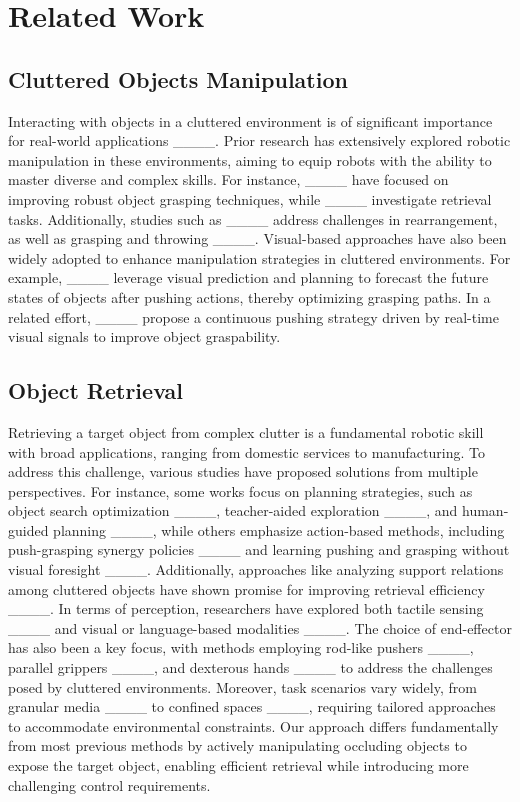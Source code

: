 \section{Related Work}
\subsection{Cluttered Objects Manipulation}
Interacting with objects in a cluttered environment is of significant importance for real-world applications ____. Prior research has extensively explored robotic manipulation in these environments, aiming to equip robots with the ability to master diverse and complex skills. For instance, ____ have focused on improving robust object grasping techniques, while ____ investigate retrieval tasks. Additionally, studies such as ____ address challenges in rearrangement, as well as grasping and throwing ____. Visual-based approaches have also been widely adopted to enhance manipulation strategies in cluttered environments. For example, ____ leverage visual prediction and planning to forecast the future states of objects after pushing actions, thereby optimizing grasping paths. In a related effort, ____ propose a continuous pushing strategy driven by real-time visual signals to improve object graspability.

\subsection{Object Retrieval}
Retrieving a target object from complex clutter is a fundamental robotic skill with broad applications, ranging from domestic services to manufacturing. To address this challenge, various studies have proposed solutions from multiple perspectives. For instance, some works focus on planning strategies, such as object search optimization ____, teacher-aided exploration ____, and human-guided planning ____, while others emphasize action-based methods, including push-grasping synergy policies ____ and learning pushing and grasping without visual foresight ____. Additionally, approaches like analyzing support relations among cluttered objects have shown promise for improving retrieval efficiency ____. In terms of perception, researchers have explored both tactile sensing ____ and visual or language-based modalities ____. The choice of end-effector has also been a key focus, with methods employing rod-like pushers ____, parallel grippers ____, and dexterous hands ____ to address the challenges posed by cluttered environments. Moreover, task scenarios vary widely, from granular media ____ to confined spaces ____, requiring tailored approaches to accommodate environmental constraints. Our approach differs fundamentally from most previous methods by actively manipulating occluding objects to expose the target object, enabling efficient retrieval while introducing more challenging control requirements.

